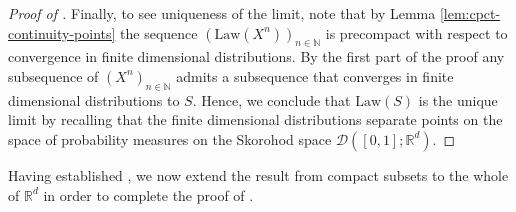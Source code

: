\documentclass[12pt,oneside]{amsart}
\theoremstyle{definition}
\newcommand{\Law}{\mathrm{Law}}
\newcommand{\N}{\mathbb N}
\newcommand{\R}{\mathbb R}
\def\R{{\mathbb R}}
\numberwithin{equation}{section}
\begin{document}
\begin{proof}[Proof of ]
Finally, to see uniqueness of the limit, note that by Lemma \ref{lem:cpct-continuity-points} the sequence $(\Law(X^n))_{n \in \N}$ is precompact with respect to convergence in finite dimensional distributions.
By the first part of the proof any subsequence of $(X^n)_{n \in \N}$ admits a subsequence that converges in finite dimensional distributions to $S$.
Hence, we conclude that $\Law(S)$ is the unique limit by recalling that the finite dimensional distributions separate points on the space of probability measures on the Skorohod space $\mathcal D([0,1];\R^d)$.
\end{proof}

Having established , we now extend the result from compact subsets to the whole of $\R^d$ in order to complete the proof of .
\end{document}
